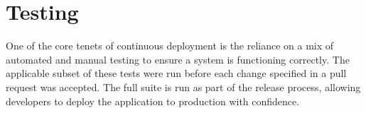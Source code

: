\chapter{Testing}
\par
One of the core tenets of continuous deployment is the reliance on a mix of automated and manual testing to ensure a system is functioning correctly. The applicable subset of these tests were run before each change specified in a pull request was accepted. The full suite is run as part of the release process, allowing developers to deploy the application to production with confidence.









